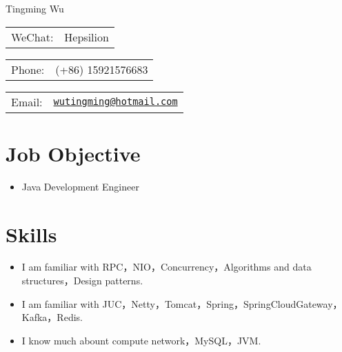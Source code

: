 \documentclass[letterpaper, UTF8]{article}
\def\name{Tingming Wu}
\begin{document}
	
	{\huge \name}
	
	
	\vspace{0.15in}  %
	
	\begin{minipage}{0.33\linewidth}
		\begin{tabular}{ll}
			WeChat: & Hepsilion \\
		\end{tabular}
	\end{minipage}
	\begin{minipage}{0.33\linewidth}
		\begin{tabular}{ll}
			Phone: & (+86) 15921576683 \\
		\end{tabular}
	\end{minipage}
	\begin{minipage}{0.33\linewidth}
		\begin{tabular}{ll}
			Email: & \href{mailto:wutingming@hotmail.com}{\tt wutingming@hotmail.com} \\
		\end{tabular}
	\end{minipage}
	\vspace{-0.1in}
	
	\section*{\textbf{Job Objective}}\vspace{-0.05in}
	\begin{itemize}
		\item Java Development Engineer
	\end{itemize}
	\vspace{-0.25in}
	
	\section*{\textbf{Skills}}\vspace{-0.05in}
	\begin{itemize}
		\item I am familiar with RPC，NIO，Concurrency，Algorithms and data structures，Design patterns.
		\item I am familiar with JUC，Netty，Tomcat，Spring，SpringCloudGateway，Kafka，Redis.
		\item I know much abount compute network，MySQL，JVM.
	\end{itemize}
	\vspace{-0.32in}
	
\end{document}
